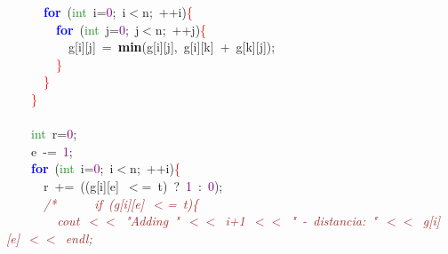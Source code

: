 \documentclass[10pt,a4paper,twoside]{article}
\begin{document}
{{{{{{{\mbox{}\ \ \ \ \ \ \textbf{\textcolor{Blue}{for}}\ \textcolor{BrickRed}{(}\textcolor{ForestGreen}{int}\ i\textcolor{BrickRed}{=}\textcolor{Purple}{0}\textcolor{BrickRed}{;}\ i\textcolor{BrickRed}{$<$}n\textcolor{BrickRed}{;}\ \textcolor{BrickRed}{++}i\textcolor{BrickRed}{)}\textcolor{Red}{\{} \\
\mbox{}\ \ \ \ \ \ \ \ \textbf{\textcolor{Blue}{for}}\ \textcolor{BrickRed}{(}\textcolor{ForestGreen}{int}\ j\textcolor{BrickRed}{=}\textcolor{Purple}{0}\textcolor{BrickRed}{;}\ j\textcolor{BrickRed}{$<$}n\textcolor{BrickRed}{;}\ \textcolor{BrickRed}{++}j\textcolor{BrickRed}{)}\textcolor{Red}{\{} \\
\mbox{}\ \ \ \ \ \ \ \ \ \ g\textcolor{BrickRed}{[}i\textcolor{BrickRed}{][}j\textcolor{BrickRed}{]}\ \textcolor{BrickRed}{=}\ \textbf{\textcolor{Black}{min}}\textcolor{BrickRed}{(}g\textcolor{BrickRed}{[}i\textcolor{BrickRed}{][}j\textcolor{BrickRed}{],}\ g\textcolor{BrickRed}{[}i\textcolor{BrickRed}{][}k\textcolor{BrickRed}{]}\ \textcolor{BrickRed}{+}\ g\textcolor{BrickRed}{[}k\textcolor{BrickRed}{][}j\textcolor{BrickRed}{]);} \\
\mbox{}\ \ \ \ \ \ \ \ \textcolor{Red}{\}} \\
\mbox{}\ \ \ \ \ \ \textcolor{Red}{\}} \\
\mbox{}\ \ \ \ \textcolor{Red}{\}} \\
\mbox{}\ \ \ \  \\
\mbox{}\ \ \ \ \textcolor{ForestGreen}{int}\ r\textcolor{BrickRed}{=}\textcolor{Purple}{0}\textcolor{BrickRed}{;} \\
\mbox{}\ \ \ \ e\ \textcolor{BrickRed}{-=}\ \textcolor{Purple}{1}\textcolor{BrickRed}{;} \\
\mbox{}\ \ \ \ \textbf{\textcolor{Blue}{for}}\ \textcolor{BrickRed}{(}\textcolor{ForestGreen}{int}\ i\textcolor{BrickRed}{=}\textcolor{Purple}{0}\textcolor{BrickRed}{;}\ i\textcolor{BrickRed}{$<$}n\textcolor{BrickRed}{;}\ \textcolor{BrickRed}{++}i\textcolor{BrickRed}{)}\textcolor{Red}{\{} \\
\mbox{}\ \ \ \ \ \ r\ \textcolor{BrickRed}{+=}\ \textcolor{BrickRed}{((}g\textcolor{BrickRed}{[}i\textcolor{BrickRed}{][}e\textcolor{BrickRed}{]}\ \textcolor{BrickRed}{$<$=}\ t\textcolor{BrickRed}{)}\ \textcolor{BrickRed}{?}\ \textcolor{Purple}{1}\ \textcolor{BrickRed}{:}\ \textcolor{Purple}{0}\textcolor{BrickRed}{);}\ \ \ \ \ \  \\
\mbox{}\ \ \ \ \ \ \textit{\textcolor{Brown}{/*\ \ \ \ \ \ if\ (g[i][e]\ $<$=\ t)\{}} \\
\mbox{}\textit{\textcolor{Brown}{\ \ \ \ \ \ \ \ cout\ $<<$\ "{}Adding\ "{}\ $<<$\ i+1\ $<<$\ "{}\ -\ distancia:\ "{}\ $<<$\ g[i][e]\ $<<$\ endl;}} \\
}}}}}}}
\end{document}
